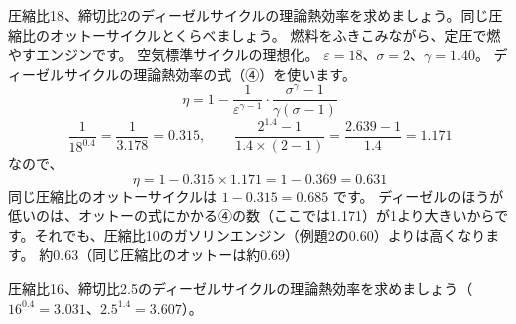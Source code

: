 \label{ph:熱-7:ex3}
\begin{phreidai}[ディーゼルサイクルの理論熱効率]
圧縮比18、締切比2のディーゼルサイクルの理論熱効率を求めましょう。同じ圧縮比のオットーサイクルとくらべましょう。
\phbamen
燃料をふきこみながら、定圧で燃やすエンジンです。
\phmushi
空気標準サイクルの理想化。
\phzu
$\varepsilon=18$、$\sigma=2$、$\gamma=1.40$。
\phriyu
ディーゼルサイクルの理論熱効率の式（④）を使います。
\phtateru
\[\eta=1-\frac{1}{\varepsilon^{\gamma-1}}\cdot\frac{\sigma^{\gamma}-1}{\gamma(\sigma-1)}\]
\phtoku
\[\frac{1}{18^{0.4}}=\frac{1}{3.178}=0.315,\qquad\frac{2^{1.4}-1}{1.4\times(2-1)}=\frac{2.639-1}{1.4}=1.171\]
なので、
\[\eta=1-0.315\times1.171=1-0.369=0.631\]
同じ圧縮比のオットーサイクルは $1-0.315=0.685$ です。
\phtashikame
ディーゼルのほうが低いのは、オットーの式にかかる④の数（ここでは1.171）が1より大きいからです。それでも、圧縮比10のガソリンエンジン（例題2の0.60）よりは高くなります。
\kotae 約0.63（同じ圧縮比のオットーは約0.69）
\end{phreidai}
\begin{jibun}
圧縮比16、締切比2.5のディーゼルサイクルの理論熱効率を求めましょう（$16^{0.4}=3.031$、$2.5^{1.4}=3.607$）。
\end{jibun}

